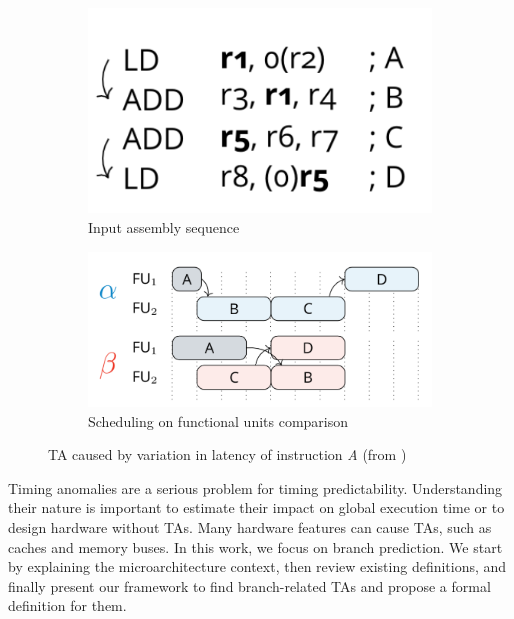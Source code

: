 \begin{figure}[H]
    \centering
    \begin{subfigure}[t]{0.3\textwidth}
        \centering
        \includegraphics[width=\textwidth]{figures/first-TA-ex-input.png}
        \caption{Input assembly sequence}
        \label{fig:TA1-code}
    \end{subfigure}
    \hfill
    \begin{subfigure}[t]{0.5\textwidth}
        \centering
        \includegraphics[width=\textwidth]{figures/first-TA-ex-trace.png}
        \caption{Scheduling on functional units comparison}
        \label{fig:TA1-trace}
    \end{subfigure}
    \caption{TA caused by variation in latency of instruction \textit{A} (from \cite{binder_definitions_2022})}
    \label{fig:TA1}
\end{figure}

Timing anomalies are a serious problem for timing predictability. Understanding their nature is important to estimate their impact on global execution time or to design hardware without TAs. Many hardware features can cause TAs, such as caches and memory buses. In this work, we focus on branch prediction. We start by explaining the microarchitecture context, then review existing definitions, and finally present our framework to find branch-related TAs and propose a formal definition for them.
